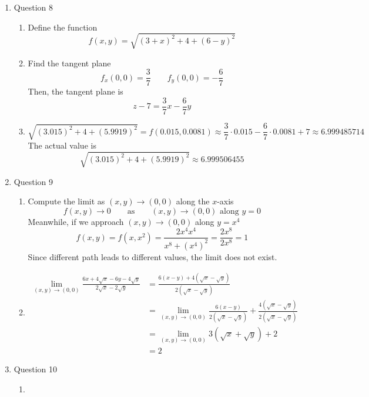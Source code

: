 \documentclass[11pt]{article}
\begin{document}
\begin{enumerate}
    \item Question 8
    \begin{enumerate}
        \item Define the function
        $$
        f(x,y) = \sqrt{(3+x)^2 + 4 + (6-y)^2}
        $$
        \item Find the tangent plane
        $$
        f_x(0,0) = \frac{3}{7} \qquad f_y(0,0) = -\frac{6}{7}
        $$
        Then, the tangent plane is
        $$
        z-7 = \frac{3}{7}x - \frac{6}{7}y
        $$
        \item
        $$
        \sqrt{(3.015)^2+4+(5.9919)^2} = f(0.015,0.0081) \approx \frac{3}{7}\cdot 0.015 - \frac{6}{7}\cdot 0.0081 + 7 \approx 6.999485714 
        $$
        The actual value is
        $$
        \sqrt{(3.015)^2+4+(5.9919)^2} \approx 6.999506455
        $$
    \end{enumerate}
    
    \item Question 9
    \begin{enumerate}
        \item Compute the limit as $(x,y)\to(0,0)$ along the $x$-axis
        $$
        f(x,y) \to 0 \qquad \text{as} \qquad (x,y)\to(0,0)\text{ along $y=0$}
        $$
        Meanwhile, if we approach $(x,y)\to(0,0)$ along $y=x^4$
        $$
        f(x,y)=f(x,x^2) = \frac{2x^4x^4}{x^8+\left(x^4\right)^2} = \frac{2x^8}{2x^8} =1
        $$
        Since different path leads to different values, the limit does not exist.
        
        \item
        $$
        \begin{aligned}
            \lim_{(x,y)\to(0,0)} \frac{6x+4\sqrt{x}-6y-4\sqrt{y}}{2\sqrt{x}-2\sqrt{y}} &= \frac{6(x-y)+4(\sqrt{x}-\sqrt{y})}{2(\sqrt{x}-\sqrt{y})} \\
            &= \lim_{(x,y)\to(0,0)}\frac{6(x-y)}{2(\sqrt{x}-\sqrt{y})} + \frac{4(\sqrt{x}-\sqrt{y})}{2(\sqrt{x}-\sqrt{y})} \\
            &= \lim_{(x,y)\to(0,0)}3(\sqrt{x}+\sqrt{y}) + 2 \\
            &= 2
        \end{aligned}
        $$
    \end{enumerate}
    
    \item Question 10
    \begin{enumerate}
        \item
        

\end{enumerate}
\end{enumerate}
\end{document}
